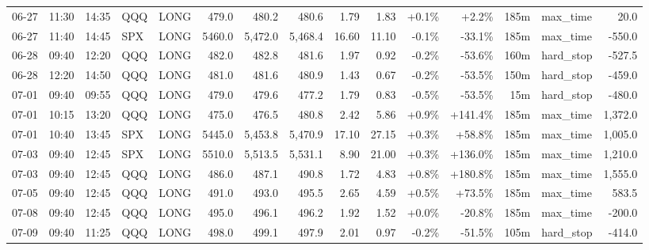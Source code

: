 \documentclass[11pt,a4paper,twoside]{article}
\begin{document}
\begin{landscape}
\begin{center}
\begin{longtable}{>{\color{txtmain}}l l l l l r r r r r r r r >{\color{txtmain}}l r}
06-27 & 11:30 & 14:35 & QQQ & LONG & 479.0 & 480.2 & 480.6 & 1.79 & 1.83 & \textcolor{wingreen}{+0.1\%} & \textcolor{wingreen}{+2.2\%} & 185m & max\_time & \textcolor{wingreen}{20.0} \\
06-27 & 11:40 & 14:45 & SPX & LONG & 5460.0 & 5,472.0 & 5,468.4 & 16.60 & 11.10 & \textcolor{lossred}{-0.1\%} & \textcolor{lossred}{-33.1\%} & 185m & max\_time & \textcolor{lossred}{-550.0} \\
06-28 & 09:40 & 12:20 & QQQ & LONG & 482.0 & 482.8 & 481.6 & 1.97 & 0.92 & \textcolor{lossred}{-0.2\%} & \textcolor{lossred}{-53.6\%} & 160m & hard\_stop & \textcolor{lossred}{-527.5} \\
06-28 & 12:20 & 14:50 & QQQ & LONG & 481.0 & 481.6 & 480.9 & 1.43 & 0.67 & \textcolor{lossred}{-0.2\%} & \textcolor{lossred}{-53.5\%} & 150m & hard\_stop & \textcolor{lossred}{-459.0} \\
07-01 & 09:40 & 09:55 & QQQ & LONG & 479.0 & 479.6 & 477.2 & 1.79 & 0.83 & \textcolor{lossred}{-0.5\%} & \textcolor{lossred}{-53.5\%} & 15m & hard\_stop & \textcolor{lossred}{-480.0} \\
07-01 & 10:15 & 13:20 & QQQ & LONG & 475.0 & 476.5 & 480.8 & 2.42 & 5.86 & \textcolor{wingreen}{+0.9\%} & \textcolor{wingreen}{+141.4\%} & 185m & max\_time & \textcolor{wingreen}{1,372.0} \\
07-01 & 10:40 & 13:45 & SPX & LONG & 5445.0 & 5,453.8 & 5,470.9 & 17.10 & 27.15 & \textcolor{wingreen}{+0.3\%} & \textcolor{wingreen}{+58.8\%} & 185m & max\_time & \textcolor{wingreen}{1,005.0} \\
07-03 & 09:40 & 12:45 & SPX & LONG & 5510.0 & 5,513.5 & 5,531.1 & 8.90 & 21.00 & \textcolor{wingreen}{+0.3\%} & \textcolor{wingreen}{+136.0\%} & 185m & max\_time & \textcolor{wingreen}{1,210.0} \\
07-03 & 09:40 & 12:45 & QQQ & LONG & 486.0 & 487.1 & 490.8 & 1.72 & 4.83 & \textcolor{wingreen}{+0.8\%} & \textcolor{wingreen}{+180.8\%} & 185m & max\_time & \textcolor{wingreen}{1,555.0} \\
07-05 & 09:40 & 12:45 & QQQ & LONG & 491.0 & 493.0 & 495.5 & 2.65 & 4.59 & \textcolor{wingreen}{+0.5\%} & \textcolor{wingreen}{+73.5\%} & 185m & max\_time & \textcolor{wingreen}{583.5} \\
07-08 & 09:40 & 12:45 & QQQ & LONG & 495.0 & 496.1 & 496.2 & 1.92 & 1.52 & \textcolor{wingreen}{+0.0\%} & \textcolor{lossred}{-20.8\%} & 185m & max\_time & \textcolor{lossred}{-200.0} \\
07-09 & 09:40 & 11:25 & QQQ & LONG & 498.0 & 499.1 & 497.9 & 2.01 & 0.97 & \textcolor{lossred}{-0.2\%} & \textcolor{lossred}{-51.5\%} & 105m & hard\_stop & \textcolor{lossred}{-414.0} \\

\end{longtable}
\end{center}
\end{landscape}
\end{document}
